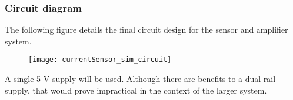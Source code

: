 \subsubsection{Circuit diagram}\label{sec:current_sensor_circuit}
The following figure details the final circuit design for the sensor and amplifier system.

\begin{figure}[h!]
  \centering
  \texttt{[image: currentSensor\_sim\_circuit]}
  \label{fig:circuit-diagram}
\end{figure}

A single 5 V supply will be used. Although there are benefits to a dual rail supply, that would prove impractical in the context of the larger system.

\pagebreak
